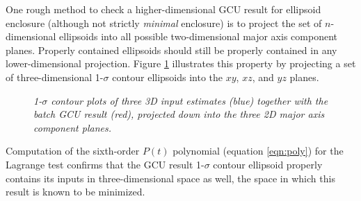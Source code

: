 One rough method to check a higher-dimensional GCU result for ellipsoid enclosure (although not strictly {\em minimal}
enclosure) is to project the set of $n$-dimensional ellipsoids into all possible two-dimensional major axis component
planes. Properly contained ellipsoids should still be properly contained in any lower-dimensional projection. Figure
\ref{fig:cu3d} illustrates this property by projecting a set of three-dimensional 1-$\sigma$ contour ellipsoids into the
$xy$, $xz$, and $yz$ planes.
\begin{figure}[tbp]
    \centering

    \caption{\it 1-$\sigma$ contour plots of three 3D input estimates (blue) together with the batch GCU result (red),
        projected down into the three 2D major axis component planes. }
    \label{fig:cu3d}
\end{figure}
Computation of the sixth-order $P(t)$ polynomial (equation \ref{eqn:poly}) for the Lagrange test confirms that the GCU
result 1-$\sigma$ contour ellipsoid properly contains its inputs in three-dimensional space as well, the space in which
this result is known to be minimized.


